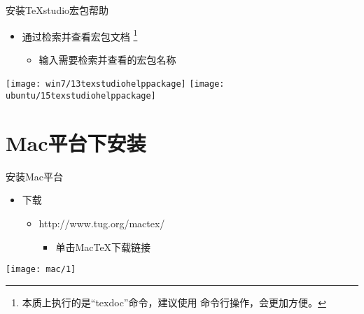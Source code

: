 \documentclass[fontset = none, t]{ctexbeamer}
\begin{document}
\begin{frame}{安装TeXstudio}{宏包帮助}
  \begin{spacing}{1.5}
    \begin{itemize}
    \item 通过检索并查看宏包文档
      \footnote[frame,1]{本质上执行的是\enquote{texdoc}命令，建议使用
        命令行操作，会更加方便。}%
      \begin{itemize}
      \item 输入需要检索并查看的\alert{宏包名称}%
      \end{itemize}
    \end{itemize}
    \begin{center}
      \texttt{[image: win7/13texstudiohelppackage]}
      \texttt{[image: ubuntu/15texstudiohelppackage]}      
    \end{center}
  \end{spacing}
\end{frame}


\section[Mac平台]{Mac平台下安装\tl}
\begin{frame}{安装\tl}{Mac平台}
  \begin{spacing}{1.0}
  \begin{itemize}
  \item 下载
    \begin{itemize}
    \item http://www.tug.org/mactex/
      \begin{itemize}
      \item 单击\alert{MacTeX}下载链接
      \end{itemize}
    \end{itemize}
  \end{itemize}
  \end{spacing}
  \centering
  \texttt{[image: mac/1]}
\end{frame}
\end{document}
